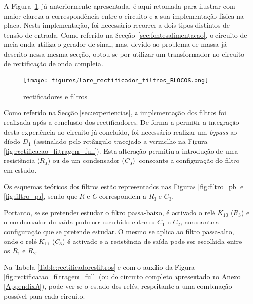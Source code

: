 A Figura~\ref{fig:implementacaoplacarectificadores}, já anteriormente apresentada, é aqui retomada para ilustrar com maior clareza a correspondência entre o circuito e a sua implementação física na placa. Nesta implementação, foi necessário recorrer a dois tipos distintos de tensão de entrada. Como referido na Secção~\ref{sec:fontesalimentacao}, o circuito de meia onda utiliza o gerador de sinal, mas, devido ao problema de massa já descrito nessa mesma secção, optou-se por utilizar um transformador no circuito de rectificação de onda completa.

\begin{figure}[hbtp]
	\centering
	\texttt{[image: figures/lare\_rectificador\_filtros\_BLOCOS.png]}
	\caption{ rectificadores e filtros}
	\label{fig:implementacaoplacarectificadores}
\end{figure}

Como referido na Secção \ref{sec:experiencias}, a implementação dos filtros foi realizada após a conclusão dos rectificadores. De forma a permitir a integração desta experiência no circuito já concluído, foi necessário realizar um \textit{bypass} ao díodo $D_{1}$ (assinalado pelo retângulo tracejado a vermelho na Figura \ref{fig:rectificacao_filtragem_full}). Esta alteração permitiu a introdução de uma resistência ($R_{3}$) ou de um condensador ($C_{3}$), consoante a configuração do filtro em estudo.

Os esquemas teóricos dos filtros estão representados nas Figuras \ref{fig:filtro_pb} e \ref{fig:filtro_pa}, sendo que $R$ e $C$  correspondem a $R_{3}$ e $C_{3}$.

Portanto, se se pretender estudar o filtro passa-baixo, é activado o relé $K_{10}$ ($R_{3}$) e o condensador de saída pode ser escolhido entre os $C_{1}$ e $C_{2}$, consoante a configuração que se pretende estudar. O mesmo se aplica ao filtro passa-alto, onde o relé $K_{11}$ ($C_{3}$) é activado e a resistência de saída pode ser escolhida entre os $R_{1}$ e $R_{2}$. 

Na Tabela \ref{Table:rectificadoresfiltros} e com o auxílio da Figura \ref{fig:rectificacao_filtragem_full} (ou do circuito completo apresentado no Anexo \ref{AppendixA}), pode ver-se o estado dos relés, respeitante a uma combinação possível para cada circuito. 

